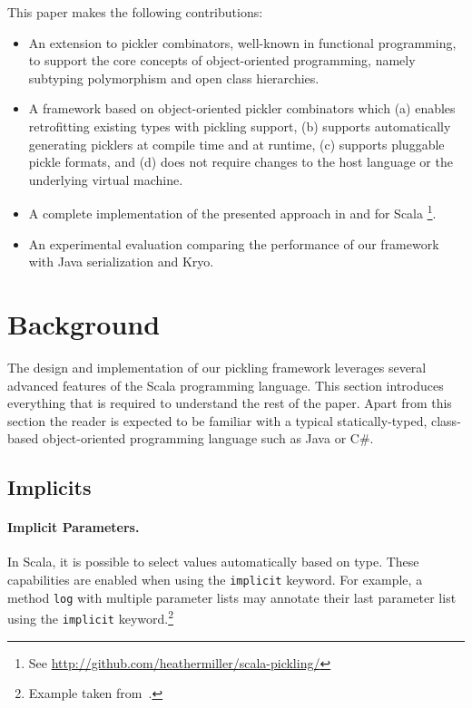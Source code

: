 \documentclass[preprint,10pt]{sigplanconf}
\theoremstyle{definition}
\theoremstyle{definition}
\newcommand{\term}[1]{\mbox{\texttt{#1}}}
\begin{document}
This paper makes the following contributions:

\begin{itemize}

\item An extension to pickler combinators, well-known in functional
programming, to support the core concepts of object-oriented programming,
namely subtyping polymorphism and open class hierarchies.

\item A framework based on object-oriented pickler combinators which (a)
enables retrofitting existing types with pickling support, (b) supports
automatically generating picklers at compile time and at runtime, (c) supports
pluggable pickle formats, and (d) does not require changes to the host
language or the underlying virtual machine.

\item A complete implementation of the presented approach in and for Scala \footnote{See
    \url{http://github.com/heathermiller/scala-pickling/}}.

\item An experimental evaluation comparing the performance of our framework
with Java serialization and Kryo.

\end{itemize}

\section{Background}
\label{sec:background}

The design and implementation of our pickling framework leverages
several advanced features of the Scala programming language. This
section introduces everything that is required to understand the rest
of the paper. Apart from this section the reader is expected to be
familiar with a typical statically-typed, class-based object-oriented
programming language such as Java or C\#.

\subsection{Implicits}
\label{sec:implicits}

\paragraph{Implicit Parameters.} In Scala, it is possible to select values
automatically based on type. These capabilities are enabled when using the
\term{implicit} keyword. For example, a method \term{log} with multiple
parameter lists may annotate their last parameter list using the
\term{implicit} keyword.\footnote{Example taken from~\cite{Oliveira2010}.}
\end{document}
